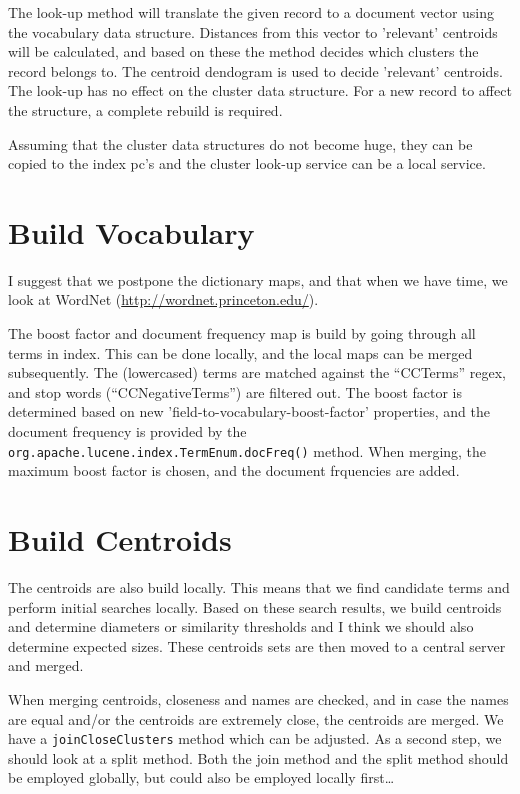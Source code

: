 \documentclass[a4paper,12pt]{article}
\begin{document}
The look-up method will translate the given record to a document
vector using the vocabulary data structure. Distances from this vector
to 'relevant' centroids will be calculated, and based on these the method
decides which clusters the record belongs to. The centroid dendogram
is used to decide 'relevant' centroids. The look-up has no
effect on the cluster data structure. For a new record to affect the
structure, a complete rebuild is required.

Assuming that the cluster data structures do not become huge, they can
be copied to the index pc's and the cluster look-up service can be a
local service.

\section{Build Vocabulary}
\label{build-vocabulary}

I suggest that we postpone the dictionary maps, and that when we have
time, we look at WordNet (\url{http://wordnet.princeton.edu/}).

The boost factor and document frequency map is build by going
through all terms in index. This can be done locally, and the local
maps can be merged subsequently. The (lowercased) terms are matched
against the ``CCTerms'' regex, and stop words (``CCNegativeTerms'')
are filtered out. The boost factor is determined based on new
'field-to-vocabulary-boost-factor' properties, and the document
frequency is provided by the
\texttt{org.apache.lucene.index.TermEnum.docFreq()} method. When
merging, the maximum boost factor is chosen, and the document
frquencies are added.

\section{Build Centroids}
\label{build-centroids}

The centroids are also build locally. This means that we find
candidate terms and perform initial searches locally. Based on these
search results, we build centroids and determine diameters or
similarity thresholds and I think we should also determine expected
sizes. These centroids sets are then moved to a central server and
merged.

When merging centroids, closeness and names are checked,
and in case the names are equal and/or the centroids are extremely
close, the centroids are merged. We have a \texttt{joinCloseClusters}
method which can be adjusted.  As a second step, we should look at a
split method. Both the join method and the split method should be
employed globally, but could also be employed locally first\ldots
\end{document}
